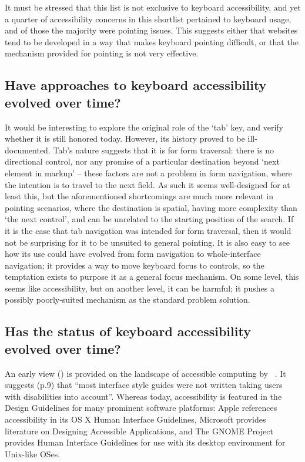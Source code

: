 \documentclass[a4paper, 11pt]{article}
\begin{document}
It must be stressed that this list is not exclusive to keyboard accessibility, and yet a quarter of accessibility concerns in this shortlist pertained to keyboard usage, and of those the majority were pointing issues. This suggests either that websites tend to be developed in a way that makes keyboard pointing difficult, or that the mechanism provided for pointing is not very effective.
\subsection{Have approaches to keyboard accessibility evolved over time?}
It would be interesting to explore the original role of the `tab' key, and verify whether it is still honored today. However, its history proved to be ill-documented. Tab's nature suggests that it is for form traversal: there is no directional control, nor any promise of a particular destination beyond `next element in markup' -- these factors are not a problem in form navigation, where the intention is to travel to the next field. As such it seems well-designed for at least this, but the aforementioned shortcomings are much more relevant in pointing scenarios, where the destination is spatial, having more complexity than `the next control', and can be unrelated to the starting position of the search.
If it is the case that tab navigation was intended for form traversal, then it would not be surprising for it to be unsuited to general pointing. It is also easy to see how its use could have evolved from form navigation to whole-interface navigation; it provides a way to move keyboard focus to controls, so the temptation exists to purpose it as a general focus mechanism. On some level, this seems like accessibility, but on another level, it can be harmful; it pushes a possibly poorly-suited mechanism as the standard problem solution.
\subsection{Has the status of keyboard accessibility evolved over time?}
\label{a11yevolution}
An early view (\citeyear{bergman1995towards}) is provided on the landscape of accessible computing by \citeauthor{bergman1995towards}~\cite{bergman1995towards}. It suggests (p.9) that ``most interface style guides were not written taking users with disabilities into account''. Whereas today, accessibility is featured in the Design Guidelines for many prominent software platforms: Apple references accessibility in its OS X Human Interface Guidelines\cite{applehig}, Microsoft provides literature on Designing Accessible Applications\cite{microsofthig}, and The GNOME Project provides Human Interface Guidelines for use with its desktop environment for Unix-like OSes\cite{gnomehig}.
\end{document}

